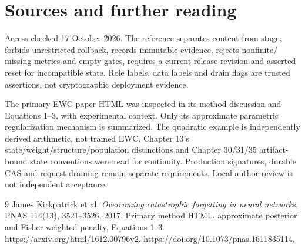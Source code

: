 \chapter*{Sources and further reading}
Access checked 17 October 2026. The reference separates content from stage, forbids unrestricted rollback, records immutable evidence, rejects nonfinite/
missing metrics and empty gates, requires a current release revision and
asserted reset for incompatible state. Role labels, data labels and drain flags
are trusted assertions, not cryptographic deployment evidence.

The primary EWC paper HTML was inspected in its method discussion and
Equations 1--3, with experimental context. Only its approximate parametric
regularization mechanism is summarized. The quadratic example is independently
derived arithmetic, not trained EWC. Chapter 13's state/weight/structure/population
distinctions and Chapter 30/31/35 artifact-bound state conventions were
read for continuity. Production signatures, durable CAS and request draining
remain separate requirements. Local author review is not independent acceptance.
\begingroup
\renewcommand{\bibname}{References}
\let\chapter\section
\begin{thebibliography}{9}
 James Kirkpatrick et al.
\emph{Overcoming catastrophic forgetting in neural networks}.
PNAS 114(13), 3521--3526, 2017. Primary method HTML, approximate posterior and
Fisher-weighted penalty, Equations 1--3.
\url{https://arxiv.org/html/1612.00796v2}.
\url{https://doi.org/10.1073/pnas.1611835114}.
\end{thebibliography}
\endgroup
